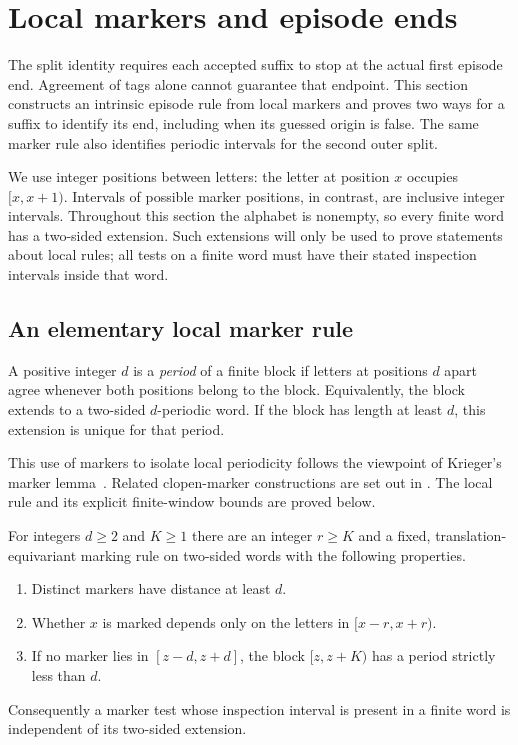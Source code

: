 \section{Local markers and episode ends}\label{sec:geometry}

The split identity requires each accepted suffix to stop at the actual
first episode end. Agreement of tags alone cannot guarantee that endpoint.
This section constructs an intrinsic episode rule from local markers and
proves two ways for a suffix to identify its end, including when its guessed
origin is false. The same marker rule also identifies periodic intervals
for the second outer split.

We use integer positions between letters: the letter at position $x$
occupies $[x,x+1)$.  Intervals of possible marker positions, in contrast,
are inclusive integer intervals.  Throughout this section the alphabet is
nonempty, so every finite word has a two-sided extension.  Such extensions
will only be used to prove statements about local rules; all tests on a
finite word must have their stated inspection intervals inside that word.

\subsection{An elementary local marker rule}

A positive integer $d$ is a \emph{period} of a finite block if letters at
positions $d$ apart agree whenever both positions belong to the block.
Equivalently, the block extends to a two-sided $d$-periodic word.  If the
block has length at least $d$, this extension is unique for that period.

This use of markers to isolate local periodicity follows the viewpoint of
Krieger's marker lemma~\cite[Lemma~2]{Krieger1982}. Related clopen-marker
constructions are set out in \cite[Lemmas~3.2--3.4]{Meyerovitch2025}.
The local rule and its explicit finite-window bounds are proved below.

\begin{lemma}\label{lem:markers}
For integers $d\ge2$ and $K\ge1$ there are an integer $r\ge K$ and a fixed,
translation-equivariant marking rule on two-sided words with the following
properties.
\begin{enumerate}[label=\textnormal{(\roman*)}]
\item Distinct markers have distance at least $d$.
\item Whether $x$ is marked depends only on the letters in $[x-r,x+r)$.
\item If no marker lies in $[z-d,z+d]$, the block $[z,z+K)$ has a period
strictly less than $d$.
\end{enumerate}
Consequently a marker test whose inspection interval is present in a
finite word is independent of its two-sided extension.
\end{lemma}

